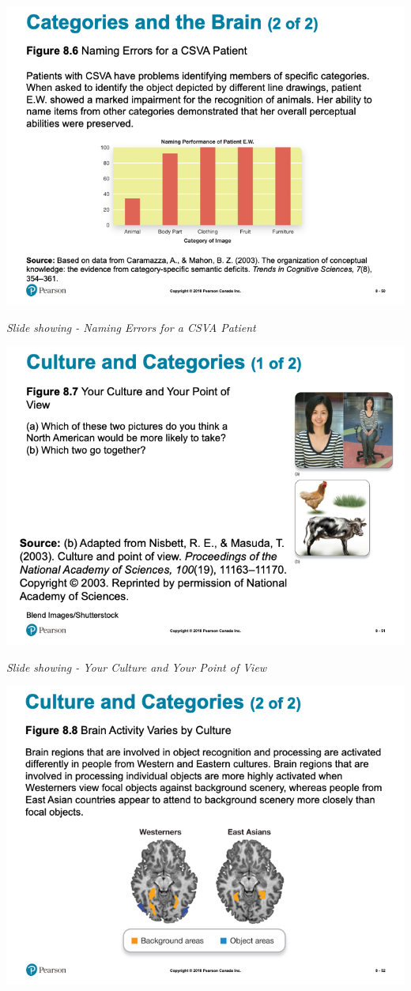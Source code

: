 \documentclass[
]{book}
\begin{document}
\includegraphics{assets/unit_1/slide_50.png}

\emph{Slide showing - Naming Errors for a CSVA Patient}

\includegraphics{assets/unit_1/slide_51.png}

\emph{Slide showing - Your Culture and Your Point of View}

\includegraphics{assets/unit_1/slide_52.png}
\end{document}
